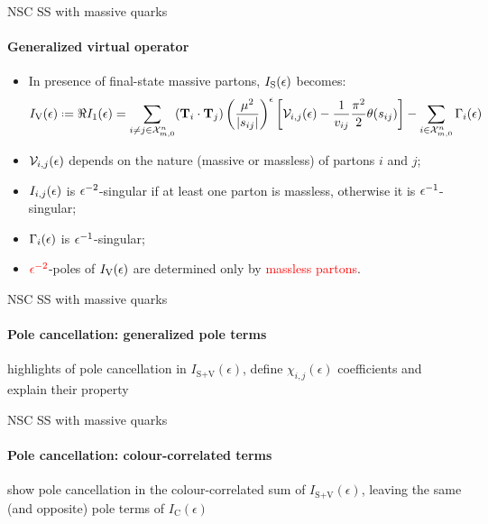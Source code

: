 
\begin{frame}{NSC SS with massive quarks}
  \framesubtitle{Generalized virtual operator}

  \justifying
  \begin{itemize}[<+->]
    \item In presence of final-state massive partons, $ I_\text{S}(\epsilon) $ becomes:
    \begin{equation*}
      \ivo(\de) \defeq \Re \ioo(\de) = \sum_{i \neq j \in \fsp{n}{m}} (\cc) \left( \frac{\mu^2}{\abs{s_{ij}}} \right)^\de \left[ \ns_{i,j}(\de) - \frac{1}{v_{ij}} \frac{\pi^2}{2} \theta(s_{ij}) \right] - \sum_{i \in \fsp{n}{m}} \Gamma_i(\de)
    \end{equation*}
    \item $ \mathcal{V}_{i,j}(\epsilon) $ depends on the nature (massive or massless) of partons $ i $ and $ j $;
    \item $ I_{i,j}(\epsilon) $ is $ \epsilon^{-2} $-singular if at least one parton is massless, otherwise it is $ \epsilon^{-1} $-singular;
    \item $ \Gamma_i(\epsilon) $ is $ \epsilon^{-1} $-singular;
    \item $ \textcolor{red}{\epsilon^{-2}} $-poles of $ I_\text{V}(\epsilon) $ are determined only by \textcolor{red}{massless partons}.
  \end{itemize}

\end{frame}


\begin{frame}{NSC SS with massive quarks}
  \framesubtitle{Pole cancellation: generalized pole terms}

  highlights of pole cancellation in $ I_{\text{S}+\text{V}}(\epsilon) $, define $ \chi_{i,j}(\epsilon) $ coefficients and explain their property

\end{frame}


\begin{frame}{NSC SS with massive quarks}
  \framesubtitle{Pole cancellation: colour-correlated terms}

  show pole cancellation in the colour-correlated sum of $ I_{\text{S}+\text{V}}(\epsilon) $, leaving the same (and opposite) pole terms of $ I_\text{C}(\epsilon) $

\end{frame}

